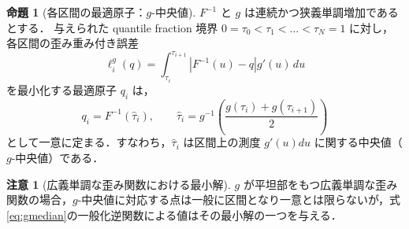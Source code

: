 \documentclass[a4paper,10pt]{jsarticle}
\theoremstyle{definition}
\newtheorem{proposition}{命題}[section]
\newtheorem{remark}{注意}[section]
\renewcommand{\Finv}{F^{-1}}
\begin{document}
\begin{proposition}[各区間の最適原子：$g$-中央値]
\label{prop:gmedian}
$\Finv$ と $g$ は連続かつ狭義単調増加であるとする．
与えられた quantile fraction 境界 $0=\tau_0<\tau_1<\dots<\tau_N=1$ に対し，各区間の歪み重み付き誤差
\begin{equation}
  \ell_i^g(q) = \int_{\tau_i}^{\tau_{i+1}} \left|\Finv(u) - q\right| g'(u)\,du
  \label{eq:g-loss-cell}
\end{equation}
を最小化する最適原子 $q_i$ は，
\begin{equation}
  q_i = \Finv(\hat\tau_i),\qquad \hat\tau_i = g^{-1}\!\left(\frac{g(\tau_i) + g(\tau_{i+1})}{2}\right)
  \label{eq:gmedian}
\end{equation}
として一意に定まる．すなわち，$\hat\tau_i$ は区間上の測度 $g'(u)du$ に関する中央値（$g$-中央値）である．
\end{proposition}

\begin{remark}[広義単調な歪み関数における最小解]
\label{rem:gmedian-flat}
$g$ が平坦部をもつ広義単調な歪み関数の場合，$g$-中央値に対応する点は一般に区間となり一意とは限らないが，式\eqref{eq:gmedian}の一般化逆関数による値はその最小解の一つを与える．
\end{remark}
\end{document}
